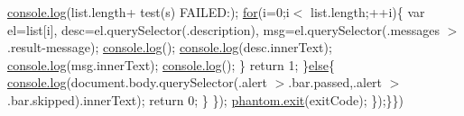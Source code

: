 \begin{DoxyCompactItemize}
\hyperlink{version_8js_a8805635a2f9bf454129d95456a5d317a}{console.\+log}(list.\+length+ \textquotesingle{}test(s) F\+A\+I\+L\+E\+D\+:\textquotesingle{});                                                               \hyperlink{printenv_8js_adf395edc207d098e5ade0b3bbab78f37}{for}(i=0;i$<$ list.\+length;++i)\{                                                                               var el=list\mbox{[}i\mbox{]},                                                                                               desc=el.\+query\+Selector(\textquotesingle{}.description\textquotesingle{}),                                                                                               msg=el.\+query\+Selector(\textquotesingle{}.messages $>$.result-\/message\textquotesingle{});                                                                               \hyperlink{version_8js_a8805635a2f9bf454129d95456a5d317a}{console.\+log}(\textquotesingle{}\textquotesingle{});                                                                               \hyperlink{version_8js_a8805635a2f9bf454129d95456a5d317a}{console.\+log}(desc.\+inner\+Text);                                                                               \hyperlink{version_8js_a8805635a2f9bf454129d95456a5d317a}{console.\+log}(msg.\+inner\+Text);                                                                               \hyperlink{version_8js_a8805635a2f9bf454129d95456a5d317a}{console.\+log}(\textquotesingle{}\textquotesingle{});                                                               \}                                                               return 1;                                                       \}\hyperlink{sleepsort_8js_a0544c3fe466e421738dae463968b70ba}{else}\{                                                               \hyperlink{version_8js_a8805635a2f9bf454129d95456a5d317a}{console.\+log}(document.\+body.\+query\+Selector(\textquotesingle{}.alert $>$.bar.\+passed,.alert $>$.bar.\+skipped\textquotesingle{}).inner\+Text);                                                               return 0;                                                       \}                                       \});                                       \hyperlink{version_8js_a01fca00da67a8c60470b440fa7083bf7}{phantom.\+exit}(exit\+Code);                       \});\}\})
\end{DoxyCompactItemize}

